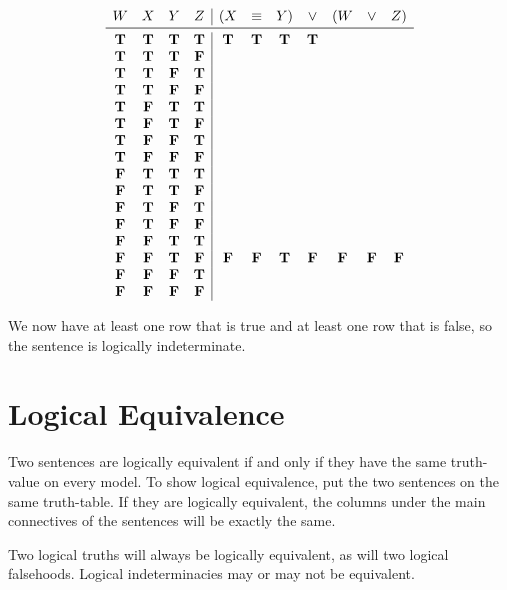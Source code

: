 \documentclass[../logic-text.tex]{subfiles}
\begin{document}
\[
\begin{array}{cccc|ccccccc}
  W & X & Y & Z & (X & \liff &  Y) & \lor & (W & \lor & Z)\\ \midrule
  \true & \true & \true & \true & \true & \true & \true & \true &&& \\
    \true & \true & \true & \false &&&&&&& \\
  \true & \true & \false & \true &&&&&&& \\
  \true & \true & \false & \false &&&&&&& \\
  \true & \false & \true & \true &&&&&&& \\
  \true & \false & \true & \false &&&&&&& \\
  \true & \false & \false & \true &&&&&&& \\
  \true & \false & \false & \false &&&&&&& \\
  \false & \true & \true & \true &&&&&&& \\
  \false & \true & \true & \false &&&&&&& \\
  \false & \true & \false & \true &&&&&&& \\
  \false & \true & \false & \false &&&&&&& \\
  \false & \false & \true & \true &&&&&&& \\
  \false & \false & \true & \false & \false & \false & \true & \false & \false & \false & \false \\
  \false & \false & \false & \true &&&&&&& \\
  \false & \false & \false & \false &&&&&&& \\
\end{array}
\]

We now have at least one row that is true and at least one row that is false, so the sentence is logically indeterminate.


\section{Logical Equivalence}
\label{sec:logical-equivalence}


Two sentences are logically equivalent if and only if they have the same truth-value on every model.
To show logical equivalence, put the two sentences on the same truth-table.
If they are logically equivalent, the columns under the main connectives of the sentences will be exactly the same.

Two logical truths will always be logically equivalent, as will two logical falsehoods.
Logical indeterminacies may or may not be equivalent.
\end{document}
